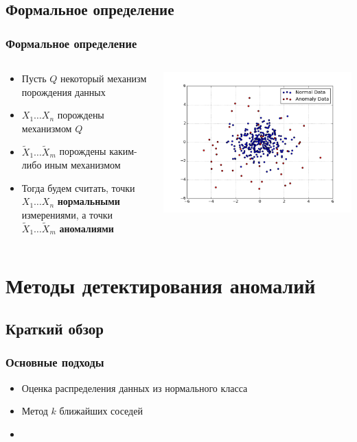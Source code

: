 \documentclass[10pt,pdf]{beamer}
\begin{document}
\subsection{Формальное определение}
\begin{frame}\frametitle{Формальное определение}
\begin{columns}[T]
\begin{column}{6cm}
\begin{itemize}

\item Пусть $Q$ некоторый механизм порождения данных
\item $X_1\ldots X_n$ порождены механизмом $Q$
\item $\tilde{X}_1 \ldots \tilde{X}_m$ порождены каким-либо иным механизмом
\item Тогда будем считать, точки $X_1\ldots X_n$ \textbf{нормальными} измерениями, а точки $\tilde{X}_1 \ldots \tilde{X}_m$ \textbf{аномалиями}
\end{itemize}
\end{column}
\begin{column}{6cm}
\includegraphics[scale=0.3]{uniform_anomaly_example.png}
\end{column}
\end{columns}
\end{frame}
\section{Методы детектирования аномалий}
\subsection{Краткий обзор}

\begin{frame}\frametitle{Основные подходы}
\begin{itemize}
\item Оценка распределения данных из нормального класса
\item Метод $k$ ближайших соседей
\item 
\end{itemize}

\end{frame}
\end{document}
